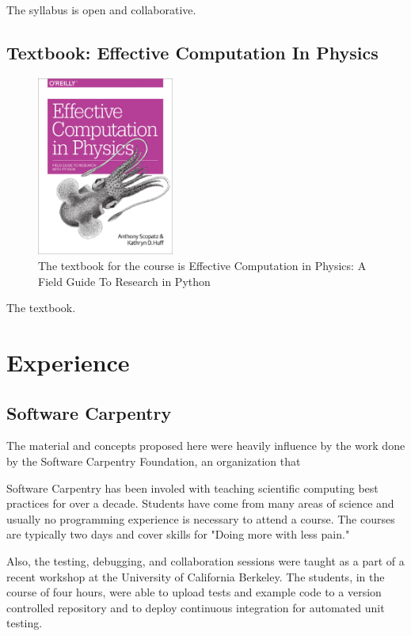 \documentclass{anstrans}
\begin{document}
The syllabus is open and collaborative.

\subsection{Textbook: Effective Computation In Physics}

\begin{figure}[htbp!]
\begin{center}
\includegraphics[width=0.4\textwidth]{ecip.eps}
\end{center}
\caption{The textbook for the course is Effective Computation in Physics: A Field Guide To Research in Python}
\label{fig:book}
\end{figure}

The textbook.
\section{Experience}

\subsection{Software Carpentry}

The material and concepts proposed here were heavily influence by the work done
by the Software Carpentry Foundation, an organization that

Software Carpentry has been involed with teaching scientific computing best
practices for over a decade. Students have come from many areas of science and
usually no programming experience is necessary to attend a course. The courses
are typically two days and cover skills for "Doing more with less pain."

Also, the testing, debugging, and collaboration sessions were taught as a part
of a recent workshop at the University of California Berkeley. The students, in
the course of four hours, were able to upload tests and example code to a
version controlled repository and to deploy continuous integration for
automated unit testing.
\end{document}
